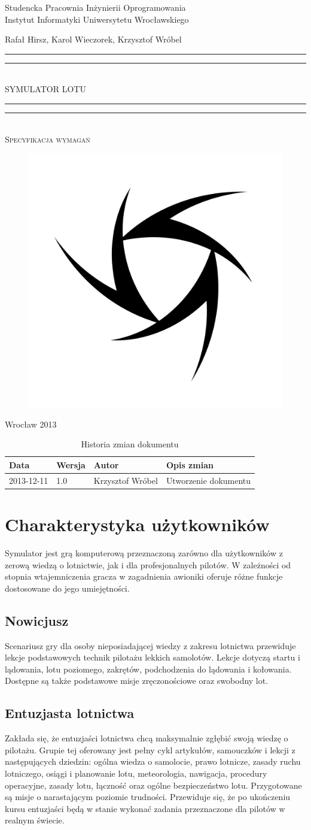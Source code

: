 \documentclass{mwrep}
\newcommand*{\titleGP}{\begingroup
\centering

{\large Studencka Pracownia Inżynierii Oprogramowania}\\Instytut Informatyki Uniwersytetu Wrocławskiego\par
\vspace*{16\baselineskip}

{\Large Rafał Hirsz, Karol Wieczorek, Krzysztof Wróbel\par}
\vspace*{\baselineskip}

\rule{\textwidth}{1.6pt}\vspace*{-\baselineskip}\vspace*{2pt}
\rule{\textwidth}{0.4pt}\\[\baselineskip]

{\Huge SYMULATOR LOTU}\\[0.2\baselineskip]

\rule{\textwidth}{0.4pt}\vspace*{-\baselineskip}\vspace{3.2pt}
\rule{\textwidth}{1.6pt}\\[\baselineskip]

\scshape
{\huge Specyfikacja wymagań}\par
\vspace*{2\baselineskip}

\begin{figure}[h]
\centering
\includegraphics[width=5\baselineskip]{flightsim-team-logo.pdf}
\end{figure}
\vfill

{\large Wrocław 2013}\par

\pagebreak

\endgroup}
\begin{document}
\thispagestyle{empty}
\titleGP

\begin{center}
\begin{table}[h]
\begin{center}
\caption{Historia zmian dokumentu}\label{T:Zmiany}
\vspace{3ex}
\begin{tabularx}{1\textwidth}{|l|l|l|X|}
\hline
Data & Wersja & Autor & Opis zmian \\ \hline
2013-12-11 & 1.0 & Krzysztof Wróbel & Utworzenie dokumentu \\
\hline
\end{tabularx}
\end{center}
\end{table}
\end{center}

\pagebreak

\tableofcontents

\chapter{Charakterystyka użytkowników}

Symulator jest grą komputerową przeznaczoną zarówno dla użytkowników z zerową wiedzą o lotnictwie, jak i dla profesjonalnych pilotów. W zależności od stopnia wtajemniczenia gracza w zagadnienia awioniki oferuje różne funkcje dostosowane do jego umiejętności.

\section{Nowicjusz}

Scenariusz gry dla osoby nieposiadającej wiedzy z zakresu lotnictwa przewiduje lekcje podstawowych technik pilotażu lekkich samolotów. Lekcje dotyczą startu i lądowania, lotu poziomego, zakrętów, podchodzenia do lądowania i kołowania. Dostępne są także podstawowe misje zręczonościowe oraz swobodny lot.

\section{Entuzjasta lotnictwa}

Zakłada się, że entuzjaści lotnictwa chcą maksymalnie zgłębić swoją wiedzę o pilotażu. Grupie tej oferowany jest pełny cykl artykułów, samouczków i lekcji z następujących dziedzin: ogólna wiedza o samolocie, prawo lotnicze, zasady ruchu lotniczego, osiągi i planowanie lotu, meteorologia, nawigacja, procedury operacyjne, zasady lotu, łączność oraz ogólne bezpieczeństwo lotu. Przygotowane są misje o narastającym poziomie trudności. Przewiduje się, że po ukończeniu kursu entuzjaści będą w stanie wykonać zadania przeznaczone dla pilotów w realnym świecie.
\end{document}
